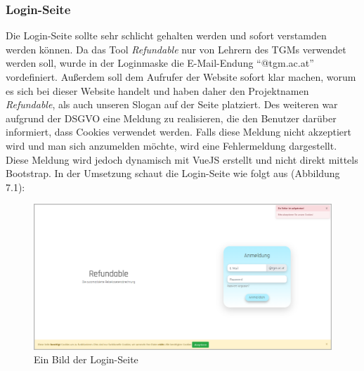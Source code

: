 \subsubsection{Login-Seite}
\label{chapter:implementierung-frontend-komponenten-login}
Die Login-Seite sollte sehr schlicht gehalten werden und sofort verstamden werden können. Da das Tool \textit{Refundable} nur von Lehrern des TGMs verwendet werden soll, wurde in der Loginmaske die E-Mail-Endung \enquote{@tgm.ac.at} vordefiniert. Außerdem soll dem Aufrufer der Website sofort klar machen, worum es sich bei dieser Website handelt und haben daher den Projektnamen \textit{Refundable}, als auch unseren Slogan auf der Seite platziert. Des weiteren war aufgrund der DSGVO eine Meldung zu realisieren, die den Benutzer darüber informiert, dass Cookies verwendet werden. Falls diese Meldung nicht akzeptiert wird und man sich anzumelden möchte, wird eine Fehlermeldung dargestellt. Diese Meldung wird jedoch dynamisch mit VueJS erstellt und nicht direkt mittels Bootstrap. In der Umsetzung schaut die Login-Seite wie folgt aus (Abbildung 7.1):
\begin{figure}[H]
	\centering
	\includegraphics[width=1\linewidth]{images/website/login}
	\caption[Login]{Ein Bild der Login-Seite}
	\label{fig:login}
\end{figure}
